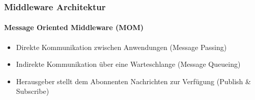 \begin{frame}
  \frametitle{Middleware Architektur}
  \framesubtitle{Message Oriented Middleware (MOM)}
  \begin{itemize}
      \item Direkte Kommunikation zwischen Anwendungen (Message Passing)
      \item Indirekte Kommunikation über eine Warteschlange (Message Queueing)
      \item Herausgeber stellt dem Abonnenten Nachrichten zur Verfügung (Publish \& Subscribe)
  \end{itemize}
\end{frame}

